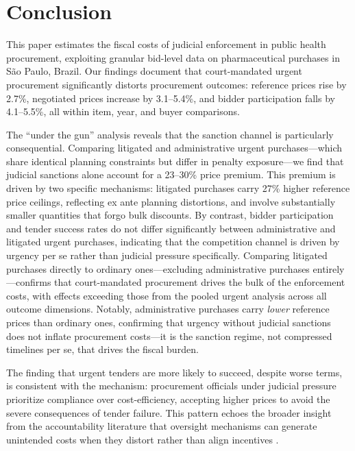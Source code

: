 \section{Conclusion}
\label{sec:conclusion}

This paper estimates the fiscal costs of judicial enforcement in public health procurement, exploiting granular bid-level data on pharmaceutical purchases in S\~ao Paulo, Brazil. Our findings document that court-mandated urgent procurement significantly distorts procurement outcomes: reference prices rise by 2.7\%, negotiated prices increase by 3.1--5.4\%, and bidder participation falls by 4.1--5.5\%, all within item, year, and buyer comparisons.

The ``under the gun'' analysis reveals that the sanction channel is particularly consequential. Comparing litigated and administrative urgent purchases---which share identical planning constraints but differ in penalty exposure---we find that judicial sanctions alone account for a 23--30\% price premium. This premium is driven by two specific mechanisms: litigated purchases carry 27\% higher reference price ceilings, reflecting ex ante planning distortions, and involve substantially smaller quantities that forgo bulk discounts. By contrast, bidder participation and tender success rates do not differ significantly between administrative and litigated urgent purchases, indicating that the competition channel is driven by urgency per se rather than judicial pressure specifically. Comparing litigated purchases directly to ordinary ones---excluding administrative purchases entirely---confirms that court-mandated procurement drives the bulk of the enforcement costs, with effects exceeding those from the pooled urgent analysis across all outcome dimensions. Notably, administrative purchases carry \textit{lower} reference prices than ordinary ones, confirming that urgency without judicial sanctions does not inflate procurement costs---it is the sanction regime, not compressed timelines per se, that drives the fiscal burden.

The finding that urgent tenders are more likely to succeed, despite worse terms, is consistent with the mechanism: procurement officials under judicial pressure prioritize compliance over cost-efficiency, accepting higher prices to avoid the severe consequences of tender failure. This pattern echoes the broader insight from the accountability literature that oversight mechanisms can generate unintended costs when they distort rather than align incentives \citep{rasul2018management, duflo2018obligations}.


